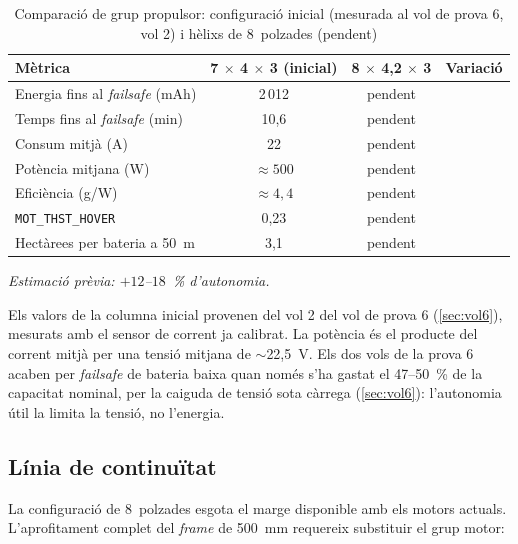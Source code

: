 \begin{table}[H]
    \centering
    \caption{Comparació de grup propulsor: configuració inicial (mesurada al vol de prova 6, vol 2) i hèlixs de 8~polzades (pendent)}
    \label{tab:resultats-propulsor}
    \begin{tabular}{lccc}
        \toprule
        Mètrica & 7 $\times$ 4 $\times$ 3 (inicial) & 8 $\times$ 4,2 $\times$ 3 & Variació \\
        \midrule
        Energia fins al \emph{failsafe} (mAh) & 2\,012 & pendent & \\
        Temps fins al \emph{failsafe} (min) & 10,6 & pendent & \\
        Consum mitjà (A) & 22 & pendent & \\
        Potència mitjana (W) & $\approx 500$ & pendent & \\
        Eficiència (g/W) & $\approx 4{,}4$ & pendent & \\
        \texttt{MOT\_THST\_HOVER} & 0,23 & pendent & \\
        Hectàrees per bateria a 50~m & 3,1 & pendent & \\
        \bottomrule
    \end{tabular}
\end{table}

\noindent\textit{Estimació prèvia: $+12$--$18$~\% d'autonomia.}

\smallskip
\noindent Els valors de la columna inicial provenen del vol 2 del vol de prova 6 (\cref{sec:vol6}), mesurats amb el sensor de corrent ja calibrat. La potència és el producte del corrent mitjà per una tensió mitjana de $\sim$22,5~V. Els dos vols de la prova 6 acaben per \emph{failsafe} de bateria baixa quan només s'ha gastat el 47--50~\% de la capacitat nominal, per la caiguda de tensió sota càrrega (\cref{sec:vol6}): l'autonomia útil la limita la tensió, no l'energia.

\subsection{Línia de continuïtat}
\label{subsec:propulsor-continuitat}

La configuració de 8~polzades esgota el marge disponible amb els motors actuals. L'aprofitament complet del \emph{frame} de 500~mm requereix substituir el grup motor:

